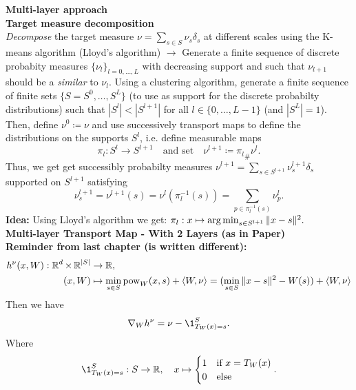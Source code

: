 \documentclass[
     12pt,         %
     a4paper,      %
     BCOR=10mm,     %
     DIV=14,        %
     ]{scrreprt}
\begin{document}
\noindent \Large\textbf{Multi-layer approach}  \\[12pt] \normalsize
%
%
\noindent \large\textbf{Target measure decomposition}  \\[8pt] \normalsize
%
\textit{Decompose} the target measure $\nu = \sum_{s\in S} \nu_s \delta_s$ at different scales using the K-means algorithm (Lloyd's algorithm) $\longrightarrow$ 
Generate a finite sequence of discrete probabity measures $\{\nu_l \}_{l=0, \dots, L}$ with decreasing support and such that $\nu_{l+1}$ should be a \textit{similar} 
to $\nu_{l}$. 
%
Using a clustering algorithm, generate a finite sequence of finite sets $\{ S \equal S^0, \dots, S^L\}$ (to use as support for the discrete probabilty distributions) such that $|S^l| < |S^{l+1}|$ for all $l\in\{0,\dots,L-1\} $ (and $|S^L|=1$).
Then, define $\nu^0 \coloneqq \nu$ and use successively transport maps to define the distributions on the supports $S^l$, i.e. define measurable maps 
\[\pi_l : S^l \to S^{l+1} \quad   \text{and set}\quad \nu^{l+1} \coloneqq {\pi_l}_{\#}\nu^l. \]
Thus, we get get successibly %
probabilty measures $\nu^{l+1} = \sum_{s\in S^{l+1}} \nu^{l+1}_s \delta_s$ supported on $S^{l+1}$ satisfying 
%
\[ \nu_s^{l+1} = \nu^{l+1}(s) = \nu^l(\pi_l^{-1}(s)) = \sum_{p \in \pi_l^{-1}(s) } \nu^l_p .\]
%
\textbf{Idea: } Using Lloyd's algorithm we get: $\pi_l:  x \mapsto \operatorname{arg\,min}_{s\in S^{l+1}} \| x - s \|^2 .$ \\[12pt]
%
\noindent \large\textbf{Multi-layer Transport Map - With 2 Layers (as in Paper)}  \\[8pt] \normalsize
\textbf{Reminder from last chapter (is written different):}
\begin{align*}
    h^\nu (x,W) : \operatorname{\mathbb{R}}^d \times \operatorname{\mathbb{R}}^{|S|} &\to \operatorname{\mathbb{R}}, \\
    (x,W) &\mapsto \min_{s\in S} \operatorname{pow}_W(x,s) + \langle W, \nu \rangle =  (\min_{s\in S} \|x-s\|^2 -W(s)) + \langle W, \nu \rangle
\end{align*}
Then we have 
\[ \nabla_W h^\nu = \nu -\1_{T_W(x)=s}^{S}. \]
Where 
\[\1_{T_W(x)=s}^{S}: S \to \R, \quad     
            x \mapsto
            \begin{cases} 
                1 &\mbox{if } x=T_W(x) \\
                0 & \mbox{else } 
            \end{cases} . \]
\end{document}
